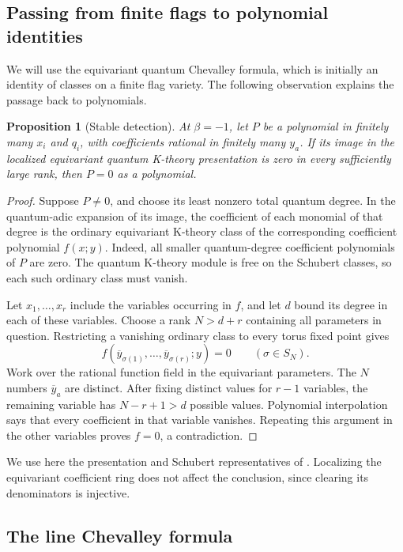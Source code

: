 \documentclass[11pt]{article}
\newtheorem{proposition}{Proposition}
\begin{document}
\subsection{Passing from finite flags to polynomial identities}

We will use the equivariant quantum Chevalley formula, which is
initially an identity of classes on a finite flag variety.
The following observation explains the passage back to polynomials.

\begin{proposition}[Stable detection]\label{prop:stable-detection}
At $\beta=-1$, let $P$ be a polynomial in finitely many $x_i$ and
$q_i$, with coefficients rational in finitely many $y_a$.
If its image in the localized equivariant quantum K-theory
presentation is zero in every sufficiently large rank, then $P=0$
as a polynomial.
\end{proposition}

\begin{proof}
Suppose $P\ne0$, and choose its least nonzero total quantum degree.
In the quantum-adic expansion of its image, the coefficient of each
monomial of that degree is the ordinary equivariant K-theory class
of the corresponding coefficient polynomial $f(x;y)$.
Indeed, all smaller quantum-degree coefficient polynomials of $P$
are zero. The quantum K-theory module is free on the Schubert
classes, so each such ordinary class must vanish.

Let $x_1,\ldots,x_r$ include the variables occurring in $f$, and
let $d$ bound its degree in each of these variables.
Choose a rank $N>d+r$ containing all parameters in question.
Restricting a vanishing ordinary class to every torus fixed point
gives
\[
 f(\overline y_{\sigma(1)},\ldots,
   \overline y_{\sigma(r)};y)=0
 \qquad(\sigma\in S_N).
\]
Work over the rational function field in the equivariant parameters.
The $N$ numbers $\overline y_a$ are distinct. After fixing distinct
values for $r-1$ variables, the remaining variable has
$N-r+1>d$ possible values. Polynomial interpolation says that
every coefficient in that variable vanishes. Repeating this
argument in the other variables proves $f=0$, a contradiction.
\end{proof}

We use here the presentation and Schubert representatives of
\cite{maeno2024presentation2}. Localizing the equivariant coefficient ring does not
affect the conclusion, since clearing its denominators is injective.

\subsection{The line Chevalley formula}
\label{sec:line-chevalley}
\end{document}
